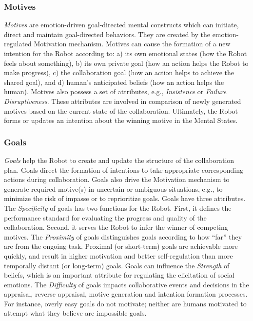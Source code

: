 \subsubsection{Motives}
\label{sec:motives}

\textit{Motives} are emotion-driven goal-directed mental constructs which can
initiate, direct and maintain goal-directed behaviors. They are created by the
emotion-regulated Motivation mechanism. Motives can cause the formation of a new
intention for the Robot according to: a) its own emotional states (how the Robot
feels about something), b) its own private goal (how an action helps the Robot
to make progress), c) the collaboration goal (how an action helps to achieve the
shared goal), and d) human's anticipated beliefs (how an action helps the
human). Motives also possess a set of attributes, e.g., \textit{Insistence} or
\textit{Failure Disruptiveness}. These attributes are involved in comparison of
newly generated motives based on the current state of the collaboration.
Ultimately, the Robot forms or updates an intention about the winning motive in
the Mental States.

\subsubsection{Goals}
\label{sec:goals}

\textit{Goals} help the Robot to create and update the structure of the
collaboration plan. Goals direct the formation of intentions to take appropriate
corresponding actions during collaboration. Goals also drive the Motivation
mechanism to generate required motive(s) in uncertain or ambiguous situations,
e.g., to minimize the risk of impasse or to reprioritize goals. Goals have
three attributes. The \textit{Specificity} of goals has two functions for the
Robot. First, it defines the performance standard for evaluating the progress
and quality of the collaboration. Second, it serves the Robot to infer the
winner of competing motives. The \textit{Proximity} of goals distinguishes goals
according to how ``far'' they are from the ongoing task. Proximal (or
short-term) goals are achievable more quickly, and result in higher motivation
and better self-regulation than more temporally distant (or long-term) goals.
Goals can influence the \textit{Strength} of beliefs, which is an important
attribute for regulating the elicitation of social emotions. The
\textit{Difficulty} of goals impacts collaborative events and decisions in the
appraisal, reverse appraisal, motive generation and intention formation
processes. For instance, overly easy goals do not motivate; neither are humans
motivated to attempt what they believe are impossible goals.

